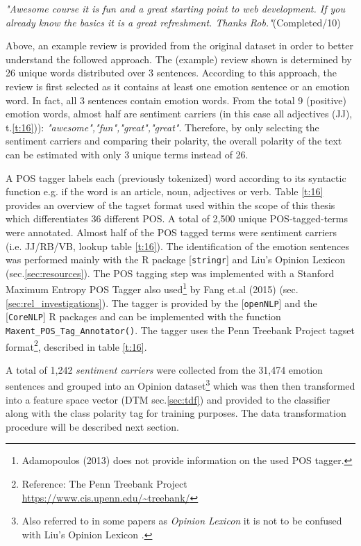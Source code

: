 \documentclass[
	a4paper,
	pdftex,
	12pt,	
	footinclude=true,
	fleqn,
	final,
	]{report}%
\begin{document}
\emph{"Awesome course it is fun and a great starting point to 
web development. If you already know the basics it is a great 
refreshment. Thanks Rob."}(Completed/10)

Above, an example review is provided from the original dataset in order to better 
understand the followed approach. The (example) review shown is determined 
by 26 unique words distributed over 3 sentences. 
According to this approach, the review is first selected as it contains 
at least one emotion sentence or an emotion word. 
In fact, all 3 sentences contain emotion words. From the total 9 (positive) 
emotion words, almost half are sentiment carriers (in this case all adjectives (JJ), t.\ref{t:16})): 
\emph{"awesome","fun","great","great"}. Therefore, by only selecting the 
sentiment carriers and comparing their polarity,
the overall polarity of the text can be estimated with only 3 unique 
terms instead of 26.

A POS tagger labels each (previously tokenized) word according to its syntactic function e.g. if the word is an 
article, noun, adjectives or verb. Table \ref{t:16} provides an overview of the 
tagset format used within the scope of this thesis which differentiates 36 different POS. 
A total of 2,500 unique POS-tagged-terms were annotated. Almost half of the POS tagged
terms were sentiment carriers (i.e. JJ/RB/VB, lookup table \ref{t:16}).
The identification of the emotion sentences was performed mainly with the 
R package [\texttt{stringr}] and Liu's Opinion Lexicon (sec.\ref{sec:resources}). 
The POS tagging step was implemented with a Stanford 
Maximum Entropy POS Tagger also used\footnote{Adamopoulos (2013) does not provide 
information on the used POS tagger.} by Fang et.al (2015) (sec.\ref{sec:rel_investigations}).
The tagger is provided by the [\texttt{openNLP}] and the [\texttt{CoreNLP}] 
R packages and can be implemented with the function \texttt{Maxent\_POS\_Tag\_Annotator()}.
The tagger uses the Penn Treebank Project tagset format\footnote{Reference: The Penn Treebank Project
\url{https://www.cis.upenn.edu/~treebank/}}, described in table \ref{t:16}. 

A total of 1,242 \emph{sentiment carriers} were collected from the
31,474 emotion sentences and grouped into an Opinion dataset\footnote{Also referred to
in some papers as \emph{Opinion Lexicon}\cite{Adamopoulos2013,Fang2015} it is not to be confused with
Liu's Opinion Lexicon \cite{Liu2004}.} which was then then transformed into a feature space vector 
(DTM sec.\ref{sec:tdf}) and provided to the classifier 
along with the class polarity tag for training purposes. The data transformation procedure will be
described next section.
\end{document}
